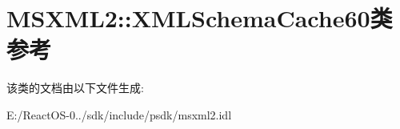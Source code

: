 \hypertarget{class_m_s_x_m_l2_1_1_x_m_l_schema_cache60}{}\section{M\+S\+X\+M\+L2\+:\+:X\+M\+L\+Schema\+Cache60类 参考}
\label{class_m_s_x_m_l2_1_1_x_m_l_schema_cache60}


该类的文档由以下文件生成\+:\begin{DoxyCompactItemize}
\item 
E\+:/\+React\+O\+S-\/0../sdk/include/psdk/msxml2.\+idl\end{DoxyCompactItemize}

